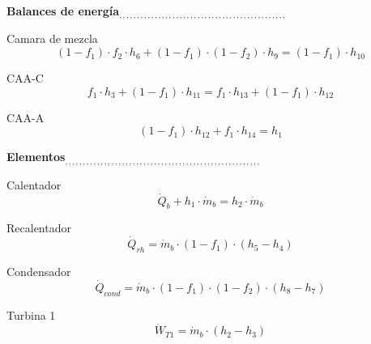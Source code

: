 \documentclass[10pt,fleqn]{article}
\theoremstyle{mytheoremstyle}
\theoremstyle{mytheoremstyle}
\theoremstyle{myproblemstyle}
\begin{document}
\vspace{0.10in}
\noindent
{\color{red} \bf Balances de energía$_{,,,,,,,,,,,,,,,,,,,,,,,,,,,,,,,,,,,,,,,,,,,,,,,}$}

\vspace{0.10in}
\noindent
{\color{blue} \rm Camara de mezcla}
\begin{equation}
\label{EES Eqn:72}
\left( 1-f_{1} \right) \cdot f_{2}\cdot h_{6}+ \left( 1-f_{1} \right) \cdot  \left( 1-f_{2} \right) \cdot h_{9}= \left( 1-f_{1} \right) \cdot h_{10} 
\end{equation}

\vspace{0.10in}
\noindent
{\color{blue} \rm CAA-C}
\begin{equation}
\label{EES Eqn:73}
f_{1}\cdot h_{3}+ \left( 1-f_{1} \right) \cdot h_{11}=f_{1}\cdot h_{13}+ \left( 1-f_{1} \right) \cdot h_{12} 
\end{equation}

\vspace{0.10in}
\noindent
{\color{blue} \rm CAA-A}
\begin{equation}
\label{EES Eqn:74}
\left( 1-f_{1} \right) \cdot h_{12}+f_{1}\cdot h_{14}=h_{1} 
\end{equation}

\vspace{0.10in}
\noindent
{\color{red} \bf Elementos$_{,,,,,,,,,,,,,,,,,,,,,,,,,,,,,,,,,,,,,,,,,,,,,,,,,,,,,,,}$}

\vspace{0.10in}
\noindent
{\color{blue} \rm Calentador}
\begin{equation}
\label{EES Eqn:75}
\dot {Q}_{b}+h_{1}\cdot \dot {m}_{b}=h_{2}\cdot \dot {m}_{b} 
\end{equation}

\vspace{0.10in}
\noindent
{\color{blue} \rm Recalentador}
\begin{equation}
\label{EES Eqn:76}
\dot {Q}_{rh}=\dot {m}_{b}\cdot  \left( 1-f_{1} \right) \cdot  \left( h_{5}-h_{4} \right)  
\end{equation}

\vspace{0.10in}
\noindent
{\color{blue} \rm Condensador}
\begin{equation}
\label{EES Eqn:77}
\dot {Q}_{cond}=\dot {m}_{b}\cdot  \left( 1-f_{1} \right) \cdot  \left( 1-f_{2} \right) \cdot  \left( h_{8}-h_{7} \right)  
\end{equation}

\vspace{0.10in}
\noindent
{\color{blue} \rm Turbina 1}
\begin{equation}
\label{EES Eqn:78}
\dot {W}_{T1}=\dot {m}_{b}\cdot  \left( h_{2}-h_{3} \right)  
\end{equation}
\end{document}
